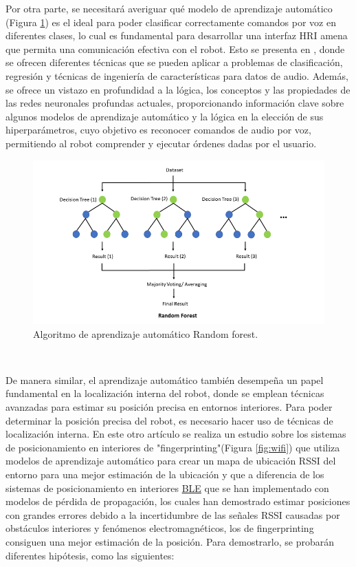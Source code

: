 Por otra parte, se necesitará averiguar qué modelo de aprendizaje automático (Figura \ref{fig:random_forest}) es el ideal para poder clasificar correctamente comandos por voz en diferentes clases, lo cual es fundamental para desarrollar una interfaz HRI amena que permita una comunicación efectiva con el robot. Esto se presenta en \cite{Zenkov-sklearn-SER-basics}, donde se ofrecen diferentes técnicas que se pueden aplicar a problemas de clasificación, regresión y técnicas de ingeniería de características para datos de audio. Además, se ofrece un vistazo en profundidad a la lógica, los conceptos y las propiedades de las redes neuronales profundas actuales, proporcionando información clave sobre algunos modelos de aprendizaje automático y la lógica en la elección de sus hiperparámetros, cuyo objetivo es reconocer comandos de audio por voz, permitiendo al robot comprender y ejecutar órdenes dadas por el usuario.\\

\begin{figure} [H]
  \begin{center}
    \includegraphics[scale=0.8]{figs/random_forest}
  \end{center}
  \caption{Algoritmo de aprendizaje automático Random forest.}
  \label{fig:random_forest}
\end{figure}\

De manera similar, el aprendizaje automático también desempeña un papel fundamental en la localización interna del robot, donde se emplean técnicas avanzadas para estimar su posición precisa en entornos interiores. Para poder determinar la posición precisa del robot, es necesario hacer uso de técnicas de localización interna. En este otro artículo \cite{unknown} se realiza un estudio sobre los sistemas de posicionamiento en interiores de "fingerprinting"(Figura \ref{fig:wifi}) que utiliza modelos de aprendizaje automático para crear un mapa de ubicación RSSI del entorno para una mejor estimación de la ubicación y que a diferencia de los sistemas de posicionamiento en interiores \hyperlink{BLE}{BLE} que se han implementado con modelos de pérdida de propagación, los cuales han demostrado estimar posiciones con grandes errores debido a la incertidumbre de las señales RSSI causadas por obstáculos interiores y fenómenos electromagnéticos, los de fingerprinting consiguen una mejor estimación de la posición. Para demostrarlo, se probarán diferentes hipótesis, como las siguientes:

